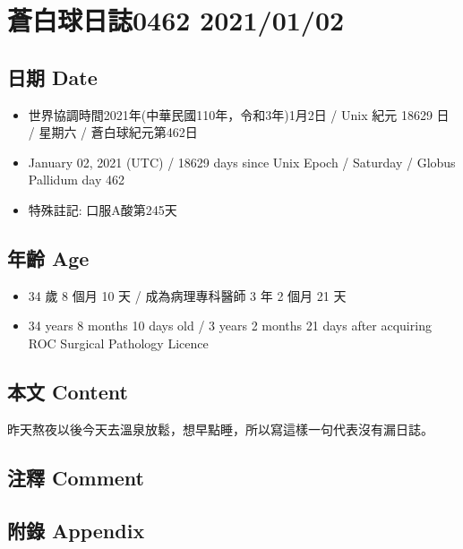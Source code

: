 \documentclass[
]{article}
\providecommand{\tightlist}{%
  \setlength{\itemsep}{0pt}\setlength{\parskip}{0pt}}
\begin{document}
\hypertarget{ux84bcux767dux7403ux65e5ux8a8c0462-20210102}{%
\section{蒼白球日誌0462
2021/01/02}\label{ux84bcux767dux7403ux65e5ux8a8c0462-20210102}}

\hypertarget{ux65e5ux671f-date-1}{%
\subsection{日期 Date}\label{ux65e5ux671f-date-1}}

\begin{itemize}
\tightlist
\item
  世界協調時間2021年(中華民國110年，令和3年)1月2日 / Unix 紀元 18629 日
  / 星期六 / 蒼白球紀元第462日
\item
  January 02, 2021 (UTC) / 18629 days since Unix Epoch / Saturday /
  Globus Pallidum day 462
\item
  特殊註記: 口服A酸第245天
\end{itemize}

\hypertarget{ux5e74ux9f61-age-1}{%
\subsection{年齡 Age}\label{ux5e74ux9f61-age-1}}

\begin{itemize}
\tightlist
\item
  34 歲 8 個月 10 天 / 成為病理專科醫師 3 年 2 個月 21 天
\item
  34 years 8 months 10 days old / 3 years 2 months 21 days after
  acquiring ROC Surgical Pathology Licence
\end{itemize}

\hypertarget{ux672cux6587-content-1}{%
\subsection{本文 Content}\label{ux672cux6587-content-1}}

昨天熬夜以後今天去溫泉放鬆，想早點睡，所以寫這樣一句代表沒有漏日誌。

\hypertarget{ux6ce8ux91cb-comment-1}{%
\subsection{注釋 Comment}\label{ux6ce8ux91cb-comment-1}}

\hypertarget{ux9644ux9304-appendix-1}{%
\subsection{附錄 Appendix}\label{ux9644ux9304-appendix-1}}
\end{document}
